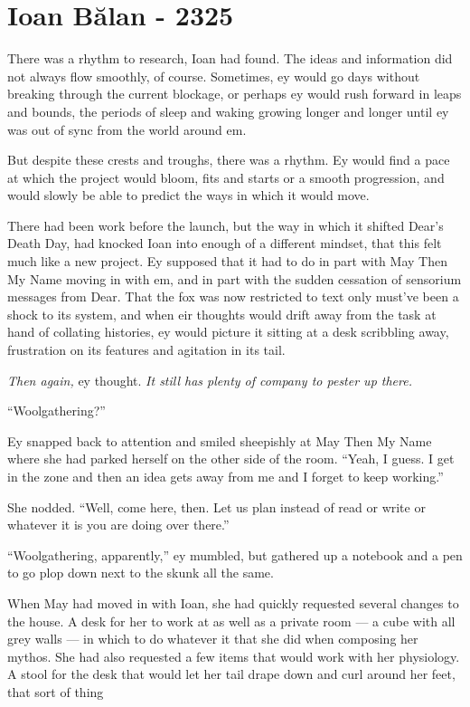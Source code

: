 \hypertarget{ioan-bux103lan—2325}{%
\chapter{Ioan Bălan - 2325}\label{ioan-bux103lan—2325}}

There was a rhythm to research, Ioan had found. The ideas and information did not always flow smoothly, of course. Sometimes, ey would go days without breaking through the current blockage, or perhaps ey would rush forward in leaps and bounds, the periods of sleep and waking growing longer and longer until ey was out of sync from the world around em.

But despite these crests and troughs, there was a rhythm. Ey would find a pace at which the project would bloom, fits and starts or a smooth progression, and would slowly be able to predict the ways in which it would move.

There had been work before the launch, but the way in which it shifted Dear's Death Day, had knocked Ioan into enough of a different mindset, that this felt much like a new project. Ey supposed that it had to do in part with May Then My Name moving in with em, and in part with the sudden cessation of sensorium messages from Dear. That the fox was now restricted to text only must've been a shock to its system, and when eir thoughts would drift away from the task at hand of collating histories, ey would picture it sitting at a desk scribbling away, frustration on its features and agitation in its tail.

\emph{Then again,} ey thought. \emph{It still has plenty of company to pester up there.}

``Woolgathering?''

Ey snapped back to attention and smiled sheepishly at May Then My Name where she had parked herself on the other side of the room. ``Yeah, I guess. I get in the zone and then an idea gets away from me and I forget to keep working.''

She nodded. ``Well, come here, then. Let us plan instead of read or write or whatever it is you are doing over there.''

``Woolgathering, apparently,'' ey mumbled, but gathered up a notebook and a pen to go plop down next to the skunk all the same.

When May had moved in with Ioan, she had quickly requested several changes to the house. A desk for her to work at as well as a private room — a cube with all grey walls — in which to do whatever it that she did when composing her mythos. She had also requested a few items that would work with her physiology. A stool for the desk that would let her tail drape down and curl around her feet, that sort of thing

